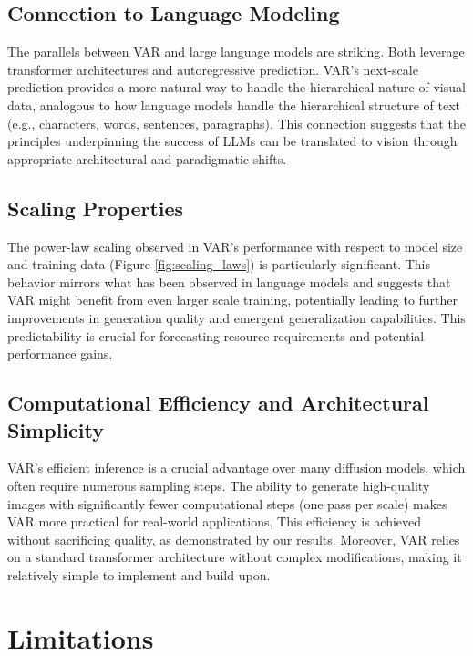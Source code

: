 \documentclass{article}
\begin{document}
\subsection{Connection to Language Modeling}
The parallels between VAR and large language models are striking. Both leverage transformer architectures and autoregressive prediction. VAR's next-scale prediction provides a more natural way to handle the hierarchical nature of visual data, analogous to how language models handle the hierarchical structure of text (e.g., characters, words, sentences, paragraphs). This connection suggests that the principles underpinning the success of LLMs can be translated to vision through appropriate architectural and paradigmatic shifts.

\subsection{Scaling Properties}
The power-law scaling observed in VAR's performance with respect to model size and training data (Figure \ref{fig:scaling_laws}) is particularly significant. This behavior mirrors what has been observed in language models \cite{kaplan2020scaling} and suggests that VAR might benefit from even larger scale training, potentially leading to further improvements in generation quality and emergent generalization capabilities. This predictability is crucial for forecasting resource requirements and potential performance gains.

\subsection{Computational Efficiency and Architectural Simplicity}
VAR's efficient inference is a crucial advantage over many diffusion models, which often require numerous sampling steps. The ability to generate high-quality images with significantly fewer computational steps (one pass per scale) makes VAR more practical for real-world applications. This efficiency is achieved without sacrificing quality, as demonstrated by our results. Moreover, VAR relies on a standard transformer architecture without complex modifications, making it relatively simple to implement and build upon.

\section{Limitations}
\label{sec:limitations}
\end{document}
